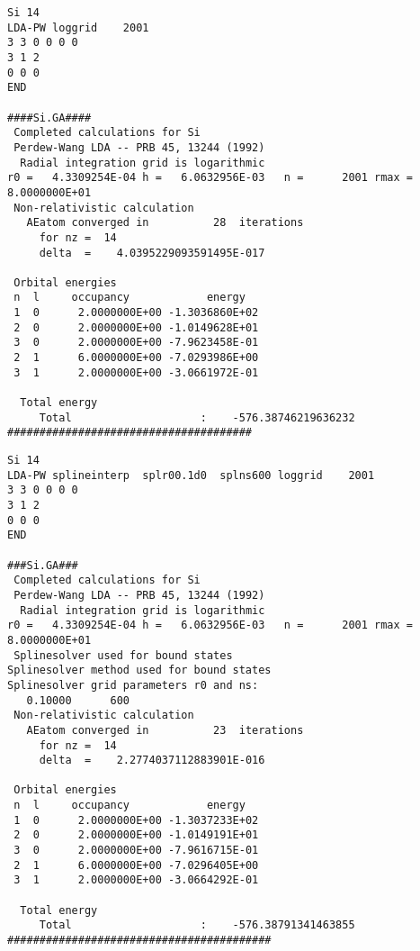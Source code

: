 \documentclass[11pt]{article}
\begin{document}
\begin{verbatim}
Si 14
LDA-PW loggrid    2001
3 3 0 0 0 0
3 1 2
0 0 0
END

####Si.GA####
 Completed calculations for Si
 Perdew-Wang LDA -- PRB 45, 13244 (1992)
  Radial integration grid is logarithmic 
r0 =   4.3309254E-04 h =   6.0632956E-03   n =      2001 rmax =   8.0000000E+01
 Non-relativistic calculation
   AEatom converged in          28  iterations
     for nz =  14
     delta  =    4.0395229093591495E-017

 Orbital energies
 n  l     occupancy            energy
 1  0      2.0000000E+00 -1.3036860E+02
 2  0      2.0000000E+00 -1.0149628E+01
 3  0      2.0000000E+00 -7.9623458E-01
 2  1      6.0000000E+00 -7.0293986E+00
 3  1      2.0000000E+00 -3.0661972E-01

  Total energy
     Total                    :    -576.38746219636232     
######################################
\end{verbatim}


\begin{verbatim}
Si 14
LDA-PW splineinterp  splr00.1d0  splns600 loggrid    2001
3 3 0 0 0 0
3 1 2
0 0 0
END

###Si.GA###
 Completed calculations for Si
 Perdew-Wang LDA -- PRB 45, 13244 (1992)
  Radial integration grid is logarithmic 
r0 =   4.3309254E-04 h =   6.0632956E-03   n =      2001 rmax =   8.0000000E+01
 Splinesolver used for bound states
Splinesolver method used for bound states
Splinesolver grid parameters r0 and ns:
   0.10000      600
 Non-relativistic calculation
   AEatom converged in          23  iterations
     for nz =  14
     delta  =    2.2774037112883901E-016

 Orbital energies
 n  l     occupancy            energy
 1  0      2.0000000E+00 -1.3037233E+02
 2  0      2.0000000E+00 -1.0149191E+01
 3  0      2.0000000E+00 -7.9616715E-01
 2  1      6.0000000E+00 -7.0296405E+00
 3  1      2.0000000E+00 -3.0664292E-01

  Total energy
     Total                    :    -576.38791341463855     
#########################################
\end{verbatim}
\end{document}
